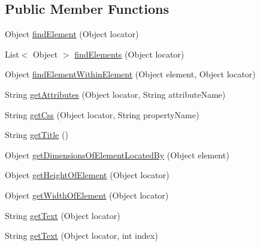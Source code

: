 \subsection*{Public Member Functions}
\begin{DoxyCompactItemize}
\item 
Object \hyperlink{interfacecom_1_1zeuslearning_1_1automation_1_1interactions_1_1IQueryHtmlElement_a78f486627e6d51d93e2cada41fdf8c0d}{find\+Element} (Object locator)
\item 
List$<$ Object $>$ \hyperlink{interfacecom_1_1zeuslearning_1_1automation_1_1interactions_1_1IQueryHtmlElement_a5c5990f50e669bc767e14aa9b8907b9b}{find\+Elements} (Object locator)
\item 
Object \hyperlink{interfacecom_1_1zeuslearning_1_1automation_1_1interactions_1_1IQueryHtmlElement_aa851cf42225ccecd3055ee8b2b2efe05}{find\+Element\+Within\+Element} (Object element, Object locator)
\item 
String \hyperlink{interfacecom_1_1zeuslearning_1_1automation_1_1interactions_1_1IQueryHtmlElement_acd3892f7d74e247cf76dd5360fc7df49}{get\+Attributes} (Object locator, String attribute\+Name)
\item 
String \hyperlink{interfacecom_1_1zeuslearning_1_1automation_1_1interactions_1_1IQueryHtmlElement_a5ba6af3b91bc23e1d3bb3551a78cea5a}{get\+Css} (Object locator, String property\+Name)
\item 
String \hyperlink{interfacecom_1_1zeuslearning_1_1automation_1_1interactions_1_1IQueryHtmlElement_a0d97c8b92f42a892ba27faef88421fb0}{get\+Title} ()
\item 
Object \hyperlink{interfacecom_1_1zeuslearning_1_1automation_1_1interactions_1_1IQueryHtmlElement_a4a495a5c92eb847a4db5f01ec4d11212}{get\+Dimensions\+Of\+Element\+Located\+By} (Object element)
\item 
Object \hyperlink{interfacecom_1_1zeuslearning_1_1automation_1_1interactions_1_1IQueryHtmlElement_a26efb264ee85d373a3276484aafad86e}{get\+Height\+Of\+Element} (Object locator)
\item 
Object \hyperlink{interfacecom_1_1zeuslearning_1_1automation_1_1interactions_1_1IQueryHtmlElement_a6edc78d4dfd12bb3e9bdbc67c9abdff3}{get\+Width\+Of\+Element} (Object locator)
\item 
String \hyperlink{interfacecom_1_1zeuslearning_1_1automation_1_1interactions_1_1IQueryHtmlElement_a246f2ac4d1610d263899d640db02f3ae}{get\+Text} (Object locator)
\item 
String \hyperlink{interfacecom_1_1zeuslearning_1_1automation_1_1interactions_1_1IQueryHtmlElement_aebeb5bdb3632e1bfc57aeee282074d14}{get\+Text} (Object locator, int index)

\end{DoxyCompactItemize}
